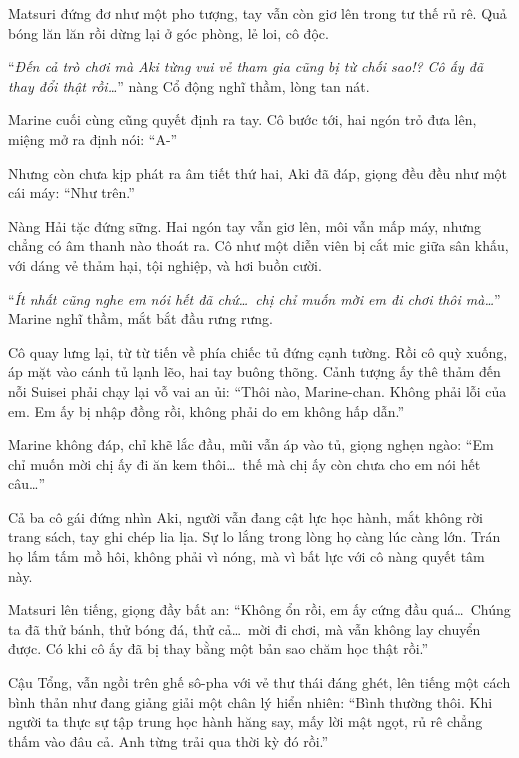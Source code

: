 \documentclass[../main.tex]{subfiles}
\begin{document}
Matsuri đứng đơ như một pho tượng, tay vẫn còn giơ lên trong tư thế rủ rê. Quả bóng lăn lăn rồi dừng lại ở góc phòng, lẻ loi, cô độc.

``\textit{Đến cả trò chơi mà Aki từng vui vẻ tham gia cũng bị từ chối sao!? Cô ấy đã thay đổi thật rồi\dots}'' nàng Cổ động nghĩ thầm, lòng tan nát.

\il

Marine cuối cùng cũng quyết định ra tay. Cô bước tới, hai ngón trỏ đưa lên, miệng mở ra định nói: ``A-''

Nhưng còn chưa kịp phát ra âm tiết thứ hai, Aki đã đáp, giọng đều đều như một cái máy: ``Như trên.''


Nàng Hải tặc đứng sững. Hai ngón tay vẫn giơ lên, môi vẫn mấp máy, nhưng chẳng có âm thanh nào thoát ra. Cô như một diễn viên bị cắt mic giữa sân khấu, với dáng vẻ thảm hại, tội nghiệp, và hơi buồn cười.

``\textit{Ít nhất cũng nghe em nói hết đã chứ\dots\ chị chỉ muốn mời em đi chơi thôi mà\dots}'' Marine nghĩ thầm, mắt bắt đầu rưng rưng.


Cô quay lưng lại, từ từ tiến về phía chiếc tủ đứng cạnh tường. Rồi cô quỳ xuống, áp mặt vào cánh tủ lạnh lẽo, hai tay buông thõng. Cảnh tượng ấy thê thảm đến nỗi Suisei phải chạy lại vỗ vai an ủi: ``Thôi nào, Marine-chan. Không phải lỗi của em. Em ấy bị nhập đồng rồi, không phải do em không hấp dẫn.''

Marine không đáp, chỉ khẽ lắc đầu, mũi vẫn áp vào tủ, giọng nghẹn ngào: ``Em chỉ muốn mời chị ấy đi ăn kem thôi\dots\ thế mà chị ấy còn chưa cho em nói hết câu\dots''

\ct

Cả ba cô gái đứng nhìn Aki, người vẫn đang cật lực học hành, mắt không rời trang sách, tay ghi chép lia lịa. Sự lo lắng trong lòng họ càng lúc càng lớn. Trán họ lấm tấm mồ hôi, không phải vì nóng, mà vì bất lực với cô nàng quyết tâm này.

Matsuri lên tiếng, giọng đầy bất an: ``Không ổn rồi, em ấy cứng đầu quá\dots\ Chúng ta đã thử bánh, thử bóng đá, thử cả\dots\ mời đi chơi, mà vẫn không lay chuyển được. Có khi cô ấy đã bị thay bằng một bản sao chăm học thật rồi.''

Cậu Tổng, vẫn ngồi trên ghế sô-pha với vẻ thư thái đáng ghét, lên tiếng một cách bình thản như đang giảng giải một chân lý hiển nhiên: ``Bình thường thôi. Khi người ta thực sự tập trung học hành hăng say, mấy lời mật ngọt, rủ rê chẳng thấm vào đâu cả. Anh từng trải qua thời kỳ đó rồi.''
\end{document}

